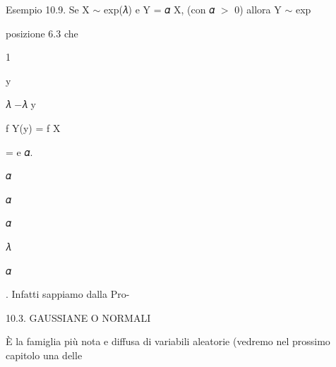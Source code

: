 \documentclass[a4paper,portrait,12pt]{article}
\begin{document}
\begin{flushleft}
Esempio 10.9. Se X $\sim$ exp(𝜆) e Y = 𝛼 X, (con 𝛼 $>$ 0) allora Y $\sim$ exp
\end{flushleft}


\begin{flushleft}
posizione 6.3 che
\end{flushleft}


1


\begin{flushleft}
y
\end{flushleft}


\begin{flushleft}
𝜆 $-$𝜆 y
\end{flushleft}


\begin{flushleft}
f Y(y) = f X
\end{flushleft}


\begin{flushleft}
= e 𝛼.
\end{flushleft}


\begin{flushleft}
𝛼
\end{flushleft}


\begin{flushleft}
𝛼
\end{flushleft}


\begin{flushleft}
𝛼
\end{flushleft}





\begin{flushleft}
𝜆
\end{flushleft}


\begin{flushleft}
𝛼
\end{flushleft}





\begin{flushleft}
. Infatti sappiamo dalla Pro-
\end{flushleft}





\begin{flushleft}
10.3. GAUSSIANE O NORMALI
\end{flushleft}


\begin{flushleft}
\`{E} la famiglia più nota e diffusa di variabili aleatorie (vedremo nel prossimo capitolo una delle
\end{flushleft}
\end{document}
